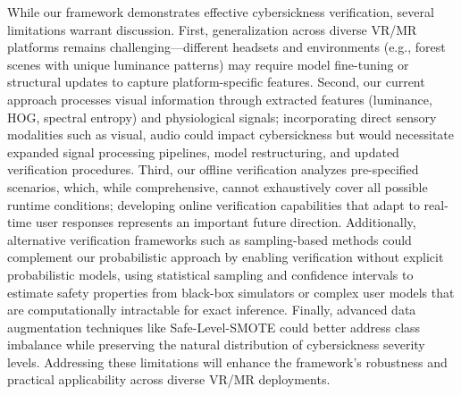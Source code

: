 \documentclass{vgtc}                          %
\begin{document}
While our framework demonstrates effective cybersickness verification, several limitations warrant discussion. First, generalization across diverse VR/MR platforms remains challenging—different headsets and environments (e.g., forest scenes with unique luminance patterns) may require model fine-tuning or structural updates to capture platform-specific features. Second, our current approach processes visual information through extracted features (luminance, HOG, spectral entropy) and physiological signals; incorporating direct sensory modalities such as visual, audio could impact cybersickness but would necessitate expanded signal processing pipelines, model restructuring, and updated verification procedures. Third, our offline verification analyzes pre-specified scenarios, which, while comprehensive, cannot exhaustively cover all possible runtime conditions; developing online verification capabilities that adapt to real-time user responses represents an important future direction. Additionally, alternative verification frameworks such as sampling-based methods could complement our probabilistic approach by enabling verification without explicit probabilistic models, using statistical sampling and confidence intervals to estimate safety properties from black-box simulators or complex user models that are computationally intractable for exact inference. Finally, advanced data augmentation techniques like Safe-Level-SMOTE \cite{bunkhumpornpat2009safe} could better address class imbalance while preserving the natural distribution of cybersickness severity levels. Addressing these limitations will enhance the framework's robustness and practical applicability across diverse VR/MR deployments.

\end{document}
